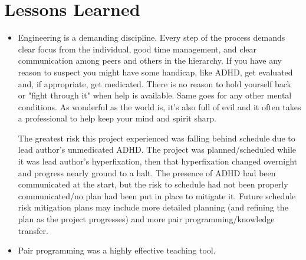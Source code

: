 \section{Lessons Learned}

\begin{itemize}

\item Engineering is a demanding discipline. Every step of the process demands clear focus from the individual, good time management, and clear communication among peers and others in the hierarchy. If you have any reason to suspect you might have some handicap, like ADHD, get evaluated and, if appropriate, get medicated. There is no reason to hold yourself back or "fight through it" when help is available. Same goes for any other mental conditions. As wonderful as the world is, it's also full of evil and it often takes a professional to help keep your mind and spirit sharp. 

The greatest risk this project experienced was falling behind schedule due to lead author's unmedicated ADHD. The project was planned/scheduled while it was lead author's hyperfixation, then that hyperfixation changed overnight and progress nearly ground to a halt. The presence of ADHD had been communicated at the start, but the risk to schedule had not been properly communicated/no plan had been put in place to mitigate it. Future schedule risk mitigation plans may include more detailed planning (and refining the plan as the project progresses) and more pair programming/knowledge transfer.

\item Pair programming was a highly effective teaching tool. 

\end{itemize}

\TODO